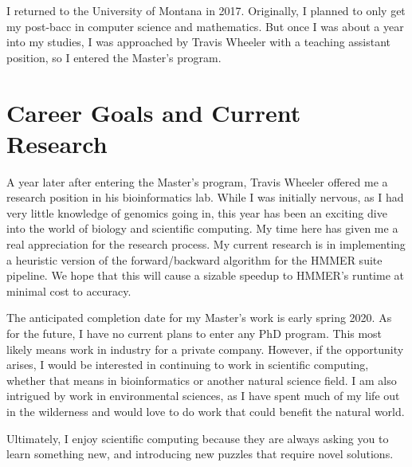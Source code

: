 \documentclass{article}
\begin{document}
	I returned to the University of Montana in 2017.  Originally, I planned to only get my post-bacc in computer science and mathematics.  But once I was about a year into my studies, I was approached by Travis Wheeler with a teaching assistant position, so I entered the Master's program. 
	
	\pagebreak
	\section{Career Goals and Current Research}
	
	A year later after entering the Master’s program, Travis Wheeler offered me a research position in his bioinformatics lab.  While I was initially nervous, as I had very little knowledge of genomics going in, this year has been an exciting dive into the world of biology and scientific computing.  My time here has given me a real appreciation for the research process.  My current research is in implementing a heuristic version of the forward/backward algorithm for the HMMER suite pipeline.  We hope that this will cause a sizable speedup to HMMER's runtime at minimal cost to accuracy.
	
	The anticipated completion date for my Master’s work is early spring 2020.  As for the future, I have no current plans to enter any PhD program.  This most likely means work in industry for a private company.  However, if the opportunity arises, I would be interested in continuing to work in scientific computing,  whether that means in bioinformatics or another natural science field.  I am also intrigued by work in environmental sciences, as I have spent much of my life out in the wilderness and would love to do work that could benefit the natural world.
	
	Ultimately, I enjoy scientific computing because they are always asking you to learn something new, and introducing new puzzles that require novel solutions.  
	
\end{document}
